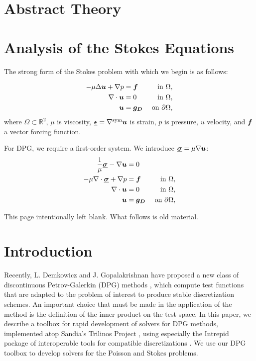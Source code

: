 

\section{Abstract Theory}

\section{Analysis of the Stokes Equations}
The strong form of the Stokes problem with which we begin is as follows:

\begin{align}
- \mu \Delta \NVRvect{u} + \NVRgrad p &= \NVRvect{f} & \text{ in } \Omega, \label{NVR:eq:strongfirst1} \\
\NVRdiv \NVRvect{u} &= 0 & \text{ in } \Omega, \\
\NVRvect{u} &= \NVRvect{g_{D}} & \text{ on } \partial\Omega,\label{NVR:eq:stronglast1}
\end{align}
where $\Omega \subset \mathbb{R}^{2}$, $\mu$ is viscosity, $\NVRtensor{\epsilon}=\NVRgrad^{\text{sym}} \NVRvect{u}$ is strain, $p$ is pressure, $u$ velocity, and $\NVRvect{f}$ a vector forcing function.

For DPG, we require a first-order system.  We introduce $\NVRtensor{\sigma}=\mu \NVRgrad \NVRvect{u}$:
\begin{align}
\frac{1}{\mu} \NVRtensor{\sigma} - \NVRgrad \NVRvect{u} &= 0 \\
- \mu \NVRdiv \NVRtensor{\sigma} + \NVRgrad p &= \NVRvect{f} & \text{ in } \Omega, \label{NVR:eq:strongfirst2} \\
\NVRdiv \NVRvect{u} &= 0 & \text{ in } \Omega, \\
\NVRvect{u} &= \NVRvect{g_{D}} & \text{ on } \partial\Omega,\label{NVR:eq:stronglast2}
\end{align}


\pagebreak

This page intentionally left blank.  What follows is old material.
\pagebreak

\section{Introduction}\label{NVR:sec:intro}
Recently, L. Demkowicz and J. Gopalakrishnan have proposed a new class of discontinuous Petrov-Galerkin (DPG) methods \cite{DPG1,DPG2,DPG3,DPG4,DPG5}, which compute test functions that are adapted to the problem of interest to produce stable discretization schemes.  An important choice that must be made in the application of the method is the definition of the inner product on the test space.  In this paper, we describe a toolbox for rapid development of solvers for DPG methods, implemented atop Sandia's Trilinos Project \cite{Trilinos}, using especially the Intrepid package of interoperable tools for compatible discretizations \cite{Intrepid}.  We use our DPG toolbox to develop solvers for the Poisson and Stokes problems.

